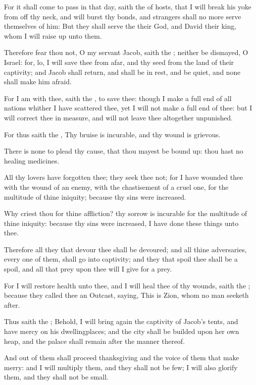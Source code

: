 \verse For it shall come to pass in that day, saith the \LORD of hosts, that I will break his yoke from off thy neck, and will burst thy bonds, and strangers shall no more serve themselves of him: \verse But they shall serve the \LORD their God, and David their king, whom I will raise up unto them.

\verse Therefore fear thou not, O my servant Jacob, saith the \LORD; neither be dismayed, O Israel: for, lo, I will save thee from afar, and thy seed from the land of their captivity; and Jacob shall return, and shall be in rest, and be quiet, and none shall make him afraid.

\verse For I am with thee, saith the \LORD, to save thee: though I make a full end of all nations whither I have scattered thee, yet I will not make a full end of thee: but I will correct thee in measure, and will not leave thee altogether unpunished.

\verse For thus saith the \LORD, Thy bruise is incurable, and thy wound is grievous.

\verse There is none to plead thy cause, that thou mayest be bound up: thou hast no healing medicines.

\verse All thy lovers have forgotten thee; they seek thee not; for I have wounded thee with the wound of an enemy, with the chastisement of a cruel one, for the multitude of thine iniquity; because thy sins were increased.

\verse Why criest thou for thine affliction? thy sorrow is incurable for the multitude of thine iniquity: because thy sins were increased, I have done these things unto thee.

\verse Therefore all they that devour thee shall be devoured; and all thine adversaries, every one of them, shall go into captivity; and they that spoil thee shall be a spoil, and all that prey upon thee will I give for a prey.

\verse For I will restore health unto thee, and I will heal thee of thy wounds, saith the \LORD; because they called thee an Outcast, saying, This is Zion, whom no man seeketh after.

\verse Thus saith the \LORD; Behold, I will bring again the captivity of Jacob's tents, and have mercy on his dwellingplaces; and the city shall be builded upon her own heap, and the palace shall remain after the manner thereof.

\verse And out of them shall proceed thanksgiving and the voice of them that make merry: and I will multiply them, and they shall not be few; I will also glorify them, and they shall not be small.

